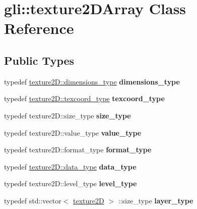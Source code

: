 \hypertarget{classgli_1_1texture2DArray}{\section{gli\-:\-:texture2\-D\-Array \-Class \-Reference}
\label{classgli_1_1texture2DArray}
}
\subsection*{\-Public \-Types}
\begin{DoxyCompactItemize}
\item 
\hypertarget{classgli_1_1texture2DArray_a8c3999eeb677c9f99662418ccd0526a4}{typedef \hyperlink{structglm_1_1detail_1_1tvec2}{texture2\-D\-::dimensions\-\_\-type} {\bfseries dimensions\-\_\-type}}\label{classgli_1_1texture2DArray_a8c3999eeb677c9f99662418ccd0526a4}

\item 
\hypertarget{classgli_1_1texture2DArray_a622e7be2e3c683689d0c4c9fe6d83ded}{typedef \hyperlink{structglm_1_1detail_1_1tvec2}{texture2\-D\-::texcoord\-\_\-type} {\bfseries texcoord\-\_\-type}}\label{classgli_1_1texture2DArray_a622e7be2e3c683689d0c4c9fe6d83ded}

\item 
\hypertarget{classgli_1_1texture2DArray_a37db285fe64e2fb73c274ba537a68d36}{typedef texture2\-D\-::size\-\_\-type {\bfseries size\-\_\-type}}\label{classgli_1_1texture2DArray_a37db285fe64e2fb73c274ba537a68d36}

\item 
\hypertarget{classgli_1_1texture2DArray_a0c1b964e6af712bd9ca5fa411b291c1d}{typedef texture2\-D\-::value\-\_\-type {\bfseries value\-\_\-type}}\label{classgli_1_1texture2DArray_a0c1b964e6af712bd9ca5fa411b291c1d}

\item 
\hypertarget{classgli_1_1texture2DArray_ad09268f20022042158df950b44e95e33}{typedef texture2\-D\-::format\-\_\-type {\bfseries format\-\_\-type}}\label{classgli_1_1texture2DArray_ad09268f20022042158df950b44e95e33}

\item 
\hypertarget{classgli_1_1texture2DArray_a14355418e330c4a435a49c6a8f5dfcbe}{typedef \hyperlink{classgli_1_1shared__array}{texture2\-D\-::data\-\_\-type} {\bfseries data\-\_\-type}}\label{classgli_1_1texture2DArray_a14355418e330c4a435a49c6a8f5dfcbe}

\item 
\hypertarget{classgli_1_1texture2DArray_a7131fd7f33217427cc769ae04036e9a2}{typedef texture2\-D\-::level\-\_\-type {\bfseries level\-\_\-type}}\label{classgli_1_1texture2DArray_a7131fd7f33217427cc769ae04036e9a2}

\item 
\hypertarget{classgli_1_1texture2DArray_a2ded4d23e5817cf5cc02f33c52914993}{typedef std\-::vector$<$ \hyperlink{classgli_1_1texture2D}{texture2\-D} $>$\*
\-::size\-\_\-type {\bfseries layer\-\_\-type}}\label{classgli_1_1texture2DArray_a2ded4d23e5817cf5cc02f33c52914993}

\end{DoxyCompactItemize}
